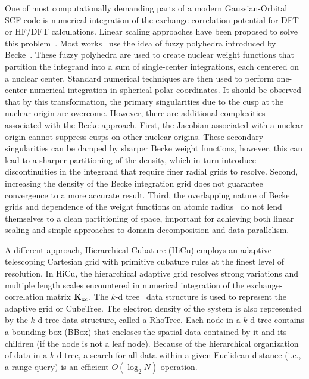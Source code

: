 \commentoutA{\documentclass[prb,aps,twocolumn,twocolumngrid]{revtex4}}
\newcommand{\Kxc}{{\bf K}_{\mathrm{xc}}}
\begin{document}
One of most computationally demanding parts of a modern
Gaussian-Orbital SCF code is numerical integration of the
exchange-correlation potential for DFT or HF/DFT calculations. Linear
scaling approaches have been proposed to solve this
problem~\cite{Jorda95,RStratmann96,CGuerra98,MChallacombe00A}.  Most
works~\cite{Furlani_00v128,Jorda95,RStratmann96,Scuseria99} use the
idea of fuzzy polyhedra introduced by Becke~\cite{Becke88}.  These
fuzzy polyhedra are used to create nuclear weight functions that
partition the integrand into a sum of single-center integrations, each
centered on a nuclear center.  Standard numerical techniques are then
used to perform one-center numerical integration in spherical polar
coordinates.  It should be observed that by this transformation, the
primary singularities due to the cusp at the nuclear origin are
overcome.  However, there are additional complexities associated with
the Becke approach.  First, the Jacobian associated with a nuclear
origin cannot suppress cusps on other nuclear origins.  These
secondary singularities can be damped by sharper Becke weight
functions, however, this can lead to a sharper partitioning of the
density, which in turn introduce discontinuities in the integrand that
require finer radial grids to resolve.  Second, increasing the density
of the Becke integration grid does not guarantee convergence to a more
accurate result.  Third, the overlapping nature of Becke grids and
dependence of the weight functions on atomic radius~\cite{Becke88} do
not lend themselves to a clean partitioning of space, important for
achieving both linear scaling and simple approaches to domain
decomposition and data parallelism.

A different approach, Hierarchical Cubature (HiCu) employs an adaptive
telescoping Cartesian grid with primitive cubature rules at the finest
level of resolution\cite{MChallacombe00A}.  In HiCu, the hierarchical
adaptive grid resolves strong variations and multiple length scales
encountered in numerical integration of the exchange-correlation
matrix $\Kxc$.  The $k$-d tree~\cite{Bentley79,Bentley80,Gaede98} data
structure is used to represent the adaptive grid or CubeTree. The
electron density of the system is also represented by the $k$-d tree
data structure, called a RhoTree.  Each node in a $k$-d tree contains
a bounding box (BBox) that encloses the spatial data contained by it
and its children (if the node is not a leaf node).  Because of the
hierarchical organization of data in a $k$-d tree, a search for all
data within a given Euclidean distance (i.e., a range query) is an
efficient $O(\log_{2}N)$ operation.
\end{document}
